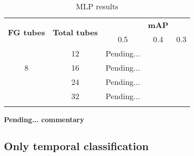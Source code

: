 \begin{center}
  \begin{longtable}{|| c | c || c c c ||}
    \hline
    \multirow{2}{*}{\textbf{FG tubes}} & \multirow{2}{*}{\textbf{Total tubes}} & {} & \textbf{mAP} & {} \\
    {} & {} & 0.5 & 0.4 & 0.3 \\
    \hline
    \multirow{3}{*}{8} & 12 & Pending...\\
    \cline{2-5}
    {} & 16 & Pending... \\
    \cline{2-5}
    {} & 24 & Pending... \\
    \cline{2-5}
    {} & 32 & Pending... \\
    \hline

  \caption{MLP results}
  \label{table:mlp_linear}
\end{longtable}
\end{center}
  

\textbf{Pending... commentary}

\subsection{Only temporal classification}

